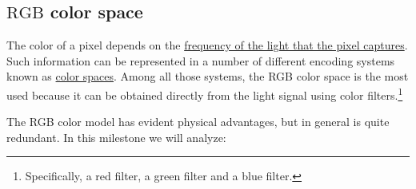 \begin{comment}
To estimate the
\href{https://en.wikipedia.org/wiki/Redundancy_(information_theory)}{redundancy}
we have basically two options:
\begin{enumerate}
\item Compute the
  \href{https://en.wikipedia.org/wiki/Entropy_(information_theory)}{0-order
    (memoryless source) entropy} of the signal: the higher the
  entropy, the lower the redudancy. In fact, if we suppose that the
  samples of the signal are uncorrelated, the 0-order entropy is an
  exact measure of the expected bit-rate achieved by an
  \href{https://en.wikipedia.org/wiki/Arithmetic_coding}{arithmetic
    encoder} (the most efficient entropy compressor). Unfortunately,
  the 0-order entropy is usually only a estimation of the redundancy,
  i.e., lower bit-rates can be achieved in practice after using a high-order
  decorrelation.
\item A better way is to use an
  \href{https://en.wikipedia.org/wiki/Data_compression}{lossless
    compressor}: the higher the length of the compressed file compared
  to the length of the original file, the lower the
  redundancy.\footnote{If the length of the compressed file is equal or
  larger than the length of the original file, then, for the compressor
  that we are using, there is not redundancy in the original
  representation.} Notice, however, that although this estimation is
  more accurate than the 0-order entropy, in general, it depends on the
  compressor (different algoritms can provide different
  estimations).
\end{enumerate}
\end{comment}


\subsection{$\text{RGB}$ color space}

The color of a pixel depends on the
\href{https://en.wikipedia.org/wiki/Visible_spectrum}{frequency of the
  light that the pixel captures}. Such information can be represented
in a number of different encoding systems known as
\href{https://en.wikipedia.org/wiki/Color_space}{color spaces}. Among
all those systems, the RGB color space is the most used because it can
be obtained directly from the light signal using color
filters.\footnote{Specifically, a red filter, a green filter and a
blue filter.}

The RGB color model has evident physical advantages, but in general is
quite redundant. In this milestone we will analyze:

